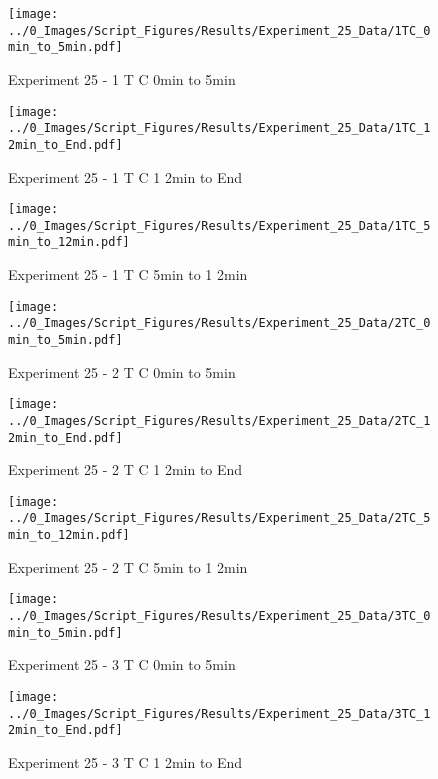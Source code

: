 	\begin{figure}[H]
		\centering
		\texttt{[image: ../0\_Images/Script\_Figures/Results/Experiment\_25\_Data/1TC\_0min\_to\_5min.pdf]}
		\caption[]{Experiment 25 - 1 T C 0min to 5min}
	\end{figure}
 

	\begin{figure}[H]
		\centering
		\texttt{[image: ../0\_Images/Script\_Figures/Results/Experiment\_25\_Data/1TC\_12min\_to\_End.pdf]}
		\caption[]{Experiment 25 - 1 T C 1 2min to End}
	\end{figure}
 
	\clearpage

	\begin{figure}[H]
		\centering
		\texttt{[image: ../0\_Images/Script\_Figures/Results/Experiment\_25\_Data/1TC\_5min\_to\_12min.pdf]}
		\caption[]{Experiment 25 - 1 T C 5min to 1 2min}
	\end{figure}
 

	\begin{figure}[H]
		\centering
		\texttt{[image: ../0\_Images/Script\_Figures/Results/Experiment\_25\_Data/2TC\_0min\_to\_5min.pdf]}
		\caption[]{Experiment 25 - 2 T C 0min to 5min}
	\end{figure}
 
	\clearpage

	\begin{figure}[H]
		\centering
		\texttt{[image: ../0\_Images/Script\_Figures/Results/Experiment\_25\_Data/2TC\_12min\_to\_End.pdf]}
		\caption[]{Experiment 25 - 2 T C 1 2min to End}
	\end{figure}
 

	\begin{figure}[H]
		\centering
		\texttt{[image: ../0\_Images/Script\_Figures/Results/Experiment\_25\_Data/2TC\_5min\_to\_12min.pdf]}
		\caption[]{Experiment 25 - 2 T C 5min to 1 2min}
	\end{figure}
 
	\clearpage

	\begin{figure}[H]
		\centering
		\texttt{[image: ../0\_Images/Script\_Figures/Results/Experiment\_25\_Data/3TC\_0min\_to\_5min.pdf]}
		\caption[]{Experiment 25 - 3 T C 0min to 5min}
	\end{figure}
 

	\begin{figure}[H]
		\centering
		\texttt{[image: ../0\_Images/Script\_Figures/Results/Experiment\_25\_Data/3TC\_12min\_to\_End.pdf]}
		\caption[]{Experiment 25 - 3 T C 1 2min to End}
	\end{figure}
 
